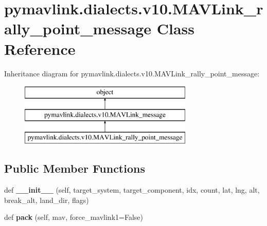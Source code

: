 \hypertarget{classpymavlink_1_1dialects_1_1v10_1_1MAVLink__rally__point__message}{}\section{pymavlink.\+dialects.\+v10.\+M\+A\+V\+Link\+\_\+rally\+\_\+point\+\_\+message Class Reference}
\label{classpymavlink_1_1dialects_1_1v10_1_1MAVLink__rally__point__message}
Inheritance diagram for pymavlink.\+dialects.\+v10.\+M\+A\+V\+Link\+\_\+rally\+\_\+point\+\_\+message\+:\begin{figure}[H]
\begin{center}
\leavevmode
\includegraphics[height=3.000000cm]{classpymavlink_1_1dialects_1_1v10_1_1MAVLink__rally__point__message}
\end{center}
\end{figure}
\subsection*{Public Member Functions}
\begin{DoxyCompactItemize}
\item 
\mbox{\label{classpymavlink_1_1dialects_1_1v10_1_1MAVLink__rally__point__message_acfacacd342f46c7def0472a1cad78e36}} 
def {\bfseries \+\_\+\+\_\+init\+\_\+\+\_\+} (self, target\+\_\+system, target\+\_\+component, idx, count, lat, lng, alt, break\+\_\+alt, land\+\_\+dir, flags)
\item 
\mbox{\label{classpymavlink_1_1dialects_1_1v10_1_1MAVLink__rally__point__message_aff0ede076d761ba17c70970f65838a9f}} 
def {\bfseries pack} (self, mav, force\+\_\+mavlink1=False)
\end{DoxyCompactItemize}
